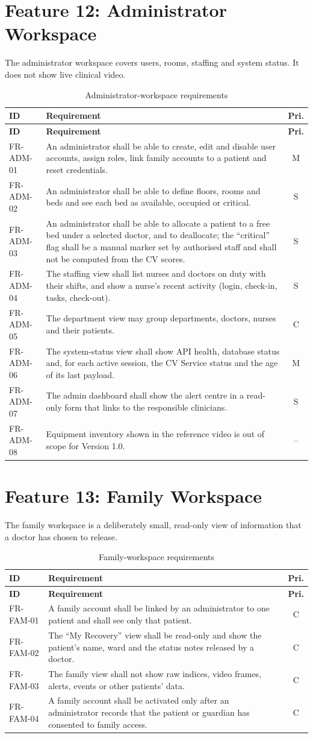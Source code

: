 \documentclass[a4paper,11pt]{scrreprt}
\makeatletter
\newenvironment{reqtable}[1]{%
  \small
  \begin{longtable}{@{}>{\ttfamily\footnotesize}p{2.55cm}>{\raggedright\arraybackslash}p{10.7cm}c@{}}
  \caption{#1}\\
  \toprule \textbf{ID} & \textbf{Requirement} & \textbf{Pri.}\\ \midrule
  \endfirsthead
  \toprule \textbf{ID} & \textbf{Requirement} & \textbf{Pri.}\\ \midrule
  \endhead
  \bottomrule
  \endfoot
}{%
  \end{longtable}\normalsize
}
\newcommand{\req}[3]{#1 & #2 & #3 \\ \midrule}
\makeatother
\begin{document}
\section{Feature 12: Administrator Workspace}
The administrator workspace covers users, rooms, staffing and system status. It does not show live clinical video.
\begin{reqtable}{Administrator-workspace requirements}
\req{FR-ADM-01}{An administrator shall be able to create, edit and disable user accounts, assign roles, link family accounts to a patient and reset credentials.}{M}
\req{FR-ADM-02}{An administrator shall be able to define floors, rooms and beds and see each bed as available, occupied or critical.}{S}
\req{FR-ADM-03}{An administrator shall be able to allocate a patient to a free bed under a selected doctor, and to deallocate; the ``critical'' flag shall be a manual marker set by authorised staff and shall not be computed from the CV scores.}{S}
\req{FR-ADM-04}{The staffing view shall list nurses and doctors on duty with their shifts, and show a nurse's recent activity (login, check-in, tasks, check-out).}{S}
\req{FR-ADM-05}{The department view may group departments, doctors, nurses and their patients.}{C}
\req{FR-ADM-06}{The system-status view shall show API health, database status and, for each active session, the CV Service status and the age of its last payload.}{M}
\req{FR-ADM-07}{The admin dashboard shall show the alert centre in a read-only form that links to the responsible clinicians.}{S}
\req{FR-ADM-08}{Equipment inventory shown in the reference video is out of scope for Version 1.0.}{--}
\end{reqtable}

\section{Feature 13: Family Workspace}
The family workspace is a deliberately small, read-only view of information that a doctor has chosen to release.
\begin{reqtable}{Family-workspace requirements}
\req{FR-FAM-01}{A family account shall be linked by an administrator to one patient and shall see only that patient.}{C}
\req{FR-FAM-02}{The ``My Recovery'' view shall be read-only and show the patient's name, ward and the status notes released by a doctor.}{C}
\req{FR-FAM-03}{The family view shall not show raw indices, video frames, alerts, events or other patients' data.}{C}
\req{FR-FAM-04}{A family account shall be activated only after an administrator records that the patient or guardian has consented to family access.}{C}
\end{reqtable}
\end{document}

